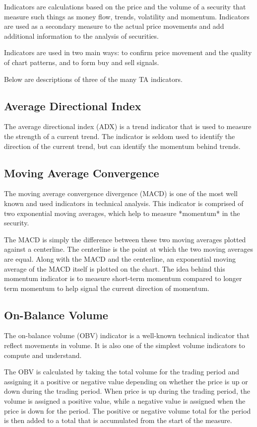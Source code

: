 \documentclass[]{article}
\begin{document}
Indicators are calculations based on the price and the volume of a security that measure such things as money flow, trends, volatility and momentum. Indicators are used as a secondary measure to the actual price movements and add additional information to the analysis of securities. 
\newline

Indicators are used in two main ways: to confirm price movement and the quality of chart patterns, and to form buy and sell signals. 


Below are descriptions of three of the many TA indicators.

\subsection{Average Directional Index} 
The average directional index (ADX) is a trend indicator that is used to measure the strength of a current trend. The indicator is seldom used to identify the direction of the current trend, but can identify the momentum behind trends. 

\subsection{Moving Average Convergence }
The moving average convergence divergence (MACD) is one of the most well known and used indicators in technical analysis. This indicator is comprised of two exponential moving averages, which help to measure *momentum* in the security. 
\newline

The MACD is simply the difference between these two moving averages plotted against a centerline. The centerline is the point at which the two moving averages are equal. Along with the MACD and the centerline, an exponential moving average of the MACD itself is plotted on the chart. The idea behind this momentum indicator is to measure short-term momentum compared to longer term momentum to help signal the current direction of momentum. 

\subsection{On-Balance Volume} 
The on-balance volume (OBV) indicator is a well-known technical indicator that reflect movements in volume. It is also one of the simplest volume indicators to compute and understand. 
\newline

The OBV is calculated by taking the total volume for the trading period and assigning it a positive or negative value depending on whether the price is up or down during the trading period. When price is up during the trading period, the volume is assigned a positive value, while a negative value is assigned when the price is down for the period. The positive or negative volume total for the period is then added to a total that is accumulated from the start of the measure. 
\end{document}
